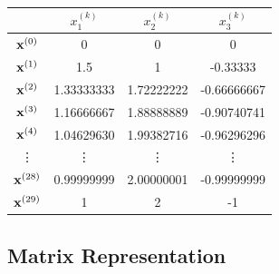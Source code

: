 \begin{center}
\begin{tabular}{c|ccc}
    & $x^{(k)}_1$ & $x^{(k)}_2$ & $x^{(k)}_3$ \\
    \hline
    $\mathbf{x}^{(0)}$ & 0 & 0 & 0 \\
    $\mathbf{x}^{(1)}$ & 1.5 & 1 & -0.33333 \\
    $\mathbf{x}^{(2)}$  & 1.33333333 & 1.72222222 & -0.66666667 \\
    $\mathbf{x}^{(3)}$  & 1.16666667 & 1.88888889 & -0.90740741 \\
    $\mathbf{x}^{(4)}$  & 1.04629630 & 1.99382716 & -0.96296296 \\
    \vdots      & \vdots     & \vdots     & \vdots      \\
    $\mathbf{x}^{(28)}$ & 0.99999999 & 2.00000001 & -0.99999999 \\
    $\mathbf{x}^{(29)}$ & 1          & 2          & -1          \\
\end{tabular}
\end{center}

\subsection*{Matrix Representation} %

